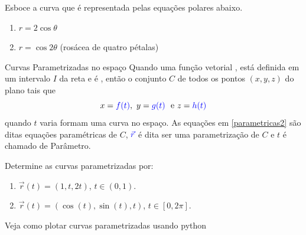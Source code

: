 \begin{frame}[label=fun-vet]
	\begin{casa}
		
		Esboce a curva que é representada pelas equações polares abaixo.
\begin{enumerate}
\item $r=2\cos\theta$
	
\item $r=\cos 2\theta$ (rosácea de quatro pétalas)
\end{enumerate}
	\end{casa}
\end{frame}


%	





\begin{frame}[label=fun-vet]{Curvas Parametrizadas no espaço}
Quando uma função vetorial , está definida em um intervalo $I$ da reta e  é , então o conjunto {\color{red}$C$} de todos os pontos $(x,y,z)$ do plano tais que
\begin{equation}\label{parametricas2}
x=\textcolor{blue}{f(t)},\  y=\textcolor{blue}{g(t)}\ \text{ e } z=\textcolor{blue}{h(t)}
\end{equation}
quando $t$ varia formam uma {\color{red}curva no espaço}. As equações em  {\color{red} \eqref{parametricas2}} são ditas {\color{red} equações paramétricas de $C$}, $\textcolor{blue}{\vec{r}}$ é dita ser uma {\color{red}parametrização de $C$} e $t$ é chamado de  {\color{red} Parâmetro}.
\begin{exe}
Determine as curvas parametrizadas por:
\begin{enumerate} 
\item $\vec{r}(t)=(1,t,2t)$, $t\in (0,1)$.
\item $\vec{r}(t)=(\cos(t),\sin(t),t)$, $t\in [0,2\pi]$.
\end{enumerate}
\end{exe}


Veja como plotar curvas parametrizadas usando python \href{https://reginaldodr.github.io/academic/posts/curvas-parametricas/curvas-parametricas.html}{}

\end{frame}

